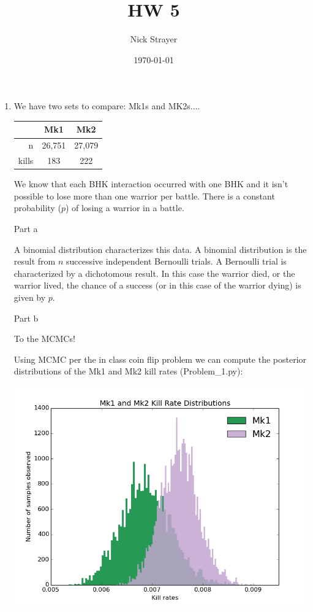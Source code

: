 \documentclass[]{article}
\begin{document}
\title{HW 5}
\author{Nick Strayer}
\date{\today}
\maketitle

\begin{enumerate}
\item We have two sets to compare: Mk1s and MK2s....

\begin{adjustbox}{center}
\begin{tabular}{r|c|c}
   & Mk1 & Mk2 \\ \hline
n & 26,751 & 27,079\\
kills & 183  & 222 \\
\end{tabular}
\end{adjustbox}

We know that each BHK interaction occurred with one BHK and it isn't possible to lose more than one warrior per battle. There is a constant probability ($p$) of losing a warrior in a battle.  

\vspace{2em}
{\large Part a} 

A binomial distribution characterizes this data. A binomial distribution is the result from $n$ successive independent Bernoulli trials. A Bernoulli trial is characterized by a dichotomous result. In this case the warrior died, or the warrior lived, the chance of a success (or in this case of the warrior dying) is given by $p$. 

\vspace{2em}
{\large Part b} 

To the MCMCs!

Using MCMC per the in class coin flip problem we can compute the posterior distributions of the Mk1 and Mk2 kill rates (Problem\_1.py): 

\centerline{\includegraphics[scale = 0.6]{Mk1_Vs_Mk2.png}}


\end{enumerate}
\end{document}
